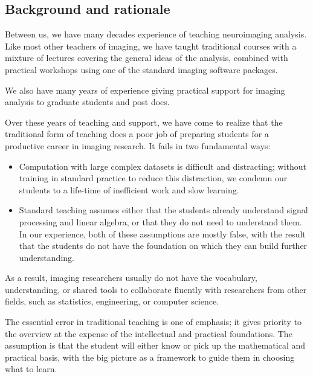 \subsection{Background and rationale}\label{background}

Between us, we have many decades experience of teaching neuroimaging analysis.
Like most other teachers of imaging, we have taught traditional courses with a
mixture of lectures covering the general ideas of the analysis, combined with
practical workshops using one of the standard imaging software packages.

We also have many years of experience giving practical support for imaging
analysis to graduate students and post docs.

Over these years of teaching and support, we have come to realize
that the traditional form of teaching does a poor job of preparing
students for a productive career in imaging research.  It fails in two
fundamental ways:

\begin{itemize}

\item
    Computation with large complex datasets is difficult and distracting;
        without training in standard practice to reduce this distraction, we
        condemn our students to a life-time of inefficient work and slow
        learning.

\item
    Standard teaching assumes either that the students already understand
        signal processing and linear algebra, or that they do not need to
        understand them.  In our experience, both of these assumptions are
        mostly false, with the result that the students do not have the
        foundation on which they can build further understanding.

\end{itemize}

As a result, imaging researchers usually do not have the vocabulary,
understanding, or shared tools to collaborate fluently with researchers from
other fields, such as statistics, engineering, or computer science.

The essential error in traditional teaching is one of emphasis;
it gives priority to the overview at the expense of the
intellectual and practical foundations.  The assumption is
that the student will either know or pick up the mathematical and
practical basis, with the big picture as a framework to guide them in
choosing what to learn.

